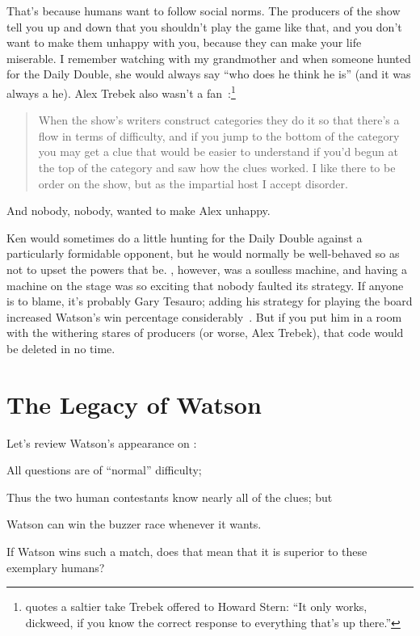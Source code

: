 That's because humans want to follow social norms.
%
The producers of the show tell you up and
down that you shouldn't play the game like that, and you don't want to
make them unhappy with you, because they can make your life miserable.
%
I remember watching \jeopardy{} with my grandmother and when someone
hunted for the Daily Double, she would always say ``who does he think
he is'' (and it was always a he).
%
Alex Trebek also wasn't a
fan~\citep{marchese-18}:\footnote{\citet{rogak-20} quotes a saltier
  take Trebek offered to Howard Stern: ``It only works, dickweed, if
  you know the correct response to everything that's up there.''}
%
\begin{quote}
  When the show's writers construct categories they do it so that
  there's a flow in terms of difficulty, and if you jump to the bottom
  of the category you may get a clue that would be easier to
  understand if you'd begun at the top of the category and saw how the
  clues worked. I like there to be order on the show, but as the
  impartial host I accept disorder.
\end{quote}
%
And nobody, nobody, wanted to make Alex unhappy.

Ken would sometimes do a little hunting for the Daily Double against a
particularly formidable opponent, but he would normally be
well-behaved so as not to upset the powers that be.
%
\watson{}, however, was a soulless machine, and having a machine on the
stage was so exciting that
nobody faulted its strategy.
%
If anyone is to blame, it's probably Gary Tesauro; adding his
strategy for playing the board increased Watson's win percentage
considerably~\citep{tesauro-13}.
%
But if you put him in a room with the withering stares of \jeopardy{}
producers (or worse, Alex Trebek), that code would be deleted in no
time.


\section{The Legacy of Watson}


Let's review Watson's appearance on \jeopardy{}:
\begin{enumerate*}
        \item All questions are of ``normal'' difficulty;
        \item Thus the two human contestants know nearly all of the clues; but
        \item Watson can win the buzzer race whenever it wants.
\end{enumerate*}
If Watson wins such a match, does that mean that it is superior to
these exemplary humans?

